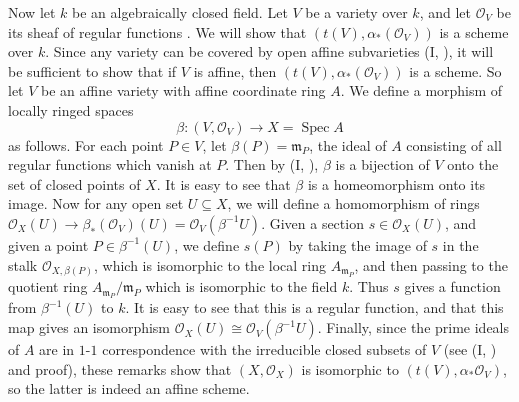 {Now let $k$ be an algebraically closed field. Let $V$ be a variety over $k$, and let $\mathcal O_V$ be its sheaf of regular functions . We will show that $(t(V),\alpha_*(\mathcal O_V))$ is a scheme over $k$. Since any variety can be covered by open affine subvarieties (I, ), it will be sufficient to show that if $V$ is affine, then $(t(V),\alpha_*(\mathcal O_V))$ is a scheme. So let $V$ be an affine variety with affine coordinate ring $A$. We define a morphism of locally ringed spaces
\[
\beta\colon(V,\mathcal O_V)\to X=\operatorname{Spec}A
\]
as follows. For each point $P\in V$, let $\beta(P)=\mathfrak m_P$, the ideal of $A$ consisting of all regular functions which vanish at $P$. Then by (I, ), $\beta$ is a bijection of $V$ onto the set of closed points of $X$. It is easy to see that $\beta$ is a homeomorphism onto its image. Now for any open set $U\subseteq X$, we will define a homomorphism of rings $\mathcal O_X(U)\to\beta_*(\mathcal O_V)(U)=\mathcal O_V(\beta^{-1}U)$. Given a section $s\in\mathcal O_X(U)$, and given a point $P\in\beta^{-1}(U)$, we define $s(P)$ by taking the image of $s$ in the stalk $\mathcal O_{X,\beta(P)}$, which is isomorphic to the local ring $A_{\mathfrak m_P}$, and then passing to the quotient ring $A_{\mathfrak m_P}/\mathfrak m_P$ which is isomorphic to the field $k$. Thus $s$ gives a function from $\beta^{-1}(U)$ to $k$. It is easy to see that this is a regular function, and that this map gives an isomorphism $\mathcal O_X(U)\cong\mathcal O_V(\beta^{-1}U)$. Finally, since the prime ideals of $A$ are in $1$-$1$ correspondence with the irreducible closed subsets of $V$ (see (I, ) and proof), these remarks show that $(X,\mathcal O_X)$ is isomorphic to $(t(V),\alpha_*\mathcal O_V)$, so the latter is indeed an affine scheme.
}
